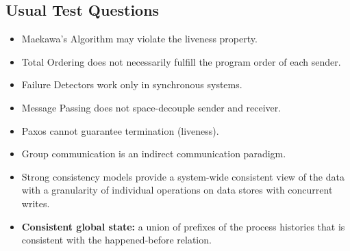 \subsection{Usual Test Questions}

\begin{itemize}
    \item Maekawa's Algorithm may violate the liveness property.
    \item Total Ordering does not necessarily fulfill the program order of each sender.
    \item Failure Detectors work only in synchronous systems.
    \item Message Passing does not space-decouple sender and receiver.
    \item Paxos cannot guarantee termination (liveness).
    \item Group communication is an indirect communication paradigm.
    \item Strong consistency models provide a system-wide consistent view of the data with a granularity of individual operations on data stores with concurrent writes.
    \item \textbf{Consistent global state:} a union of prefixes of the process histories that is consistent with the happened-before relation.
\end{itemize}
